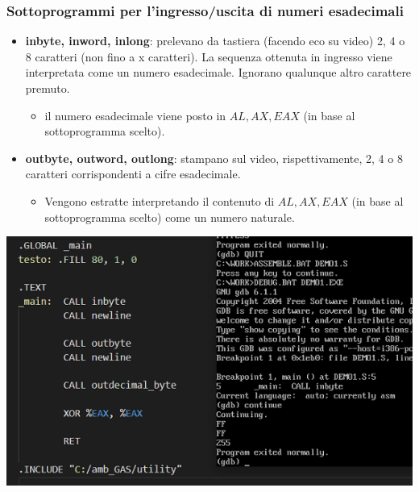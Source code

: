 \documentclass[11pt]{report}
\begin{document}
\subsubsection{Sottoprogrammi per l'ingresso/uscita di numeri esadecimali}
\begin{itemize}
\item \textbf{inbyte, inword, inlong}: prelevano da tastiera (facendo eco su video) 2, 4 o 8 caratteri (non fino a x caratteri). La sequenza ottenuta in ingresso viene interpretata come un numero esadecimale. Ignorano qualunque altro carattere premuto.
\begin{itemize}
\item il numero esadecimale viene posto in $AL, AX, EAX$ (in base al sottoprogramma scelto).
\end{itemize}
\item \textbf{outbyte, outword, outlong}: stampano sul video, rispettivamente, 2, 4 o 8 caratteri corrispondenti a cifre esadecimale. 
\begin{itemize}
\item Vengono estratte interpretando il contenuto di $AL, AX, EAX$ (in base al sottoprogramma scelto) come un numero naturale.
\end{itemize}
\end{itemize}
\begin{center}
\includegraphics{img/221.PNG}
\end{center}
\end{document}
